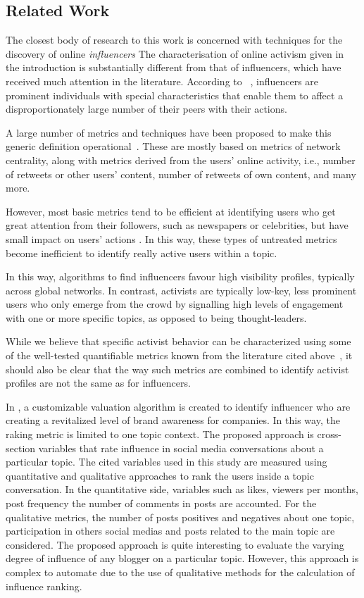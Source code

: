 \documentclass[runningheads]{llncs}
\begin{document}
\subsection{Related Work}

The closest body of research to this work is concerned with techniques for the discovery of online \textit{influencers} 
The characterisation of online activism given in the introduction is substantially different from that of influencers, which have received much attention in the literature.
According to ~\cite{Kardara2015}, influencers are prominent individuals with special characteristics that enable them to	affect a disproportionately large number of their peers with their actions.

A large number of metrics and techniques have been proposed to make this generic definition operational~\cite{RIQUELME2016949}. These are mostly based on metrics of network centrality, along with metrics derived from the users' online activity, i.e., number of retweets or other users' content, number of retweets of own content, and many more. 

However, most basic metrics tend to be efficient at identifying users who get great attention from their followers, such as newspapers or celebrities, but have small impact on users' actions \cite{MEEYOUNG2010}. In this way, these types of untreated metrics become inefficient to identify really active users within a topic.

In this way, algorithms to find influencers favour high visibility profiles, typically across global networks. In contrast, activists are typically low-key, less prominent users who only emerge from the crowd by signalling high levels of engagement with one or more specific topics, as opposed to being thought-leaders. 

While we believe that specific activist behavior can be characterized using some of the well-tested quantifiable metrics known from the literature cited above~\cite{RIQUELME2016949}, it should also be clear that the way such metrics are combined to identify activist profiles are not the same as for influencers. 

In \cite{MATIC2011}, a customizable valuation algorithm is created to identify influencer who are creating a revitalized level of brand awareness for companies. In this way, the raking metric is limited to one topic context. The proposed approach is cross-section variables that rate influence in social media conversations about a particular topic. The cited variables used in this study are measured using quantitative and qualitative approaches to rank the users inside a topic conversation. In the quantitative side, variables such as likes, viewers per months, post frequency the number of comments in posts are accounted. For the qualitative metrics, the number of posts positives and negatives about one topic, participation in others social medias and posts related to the main topic are considered.  The proposed approach is quite interesting to evaluate the varying degree of influence of any blogger on a particular topic. However, this approach is complex to automate due to the use of qualitative methods for the calculation of influence ranking.
\end{document}

